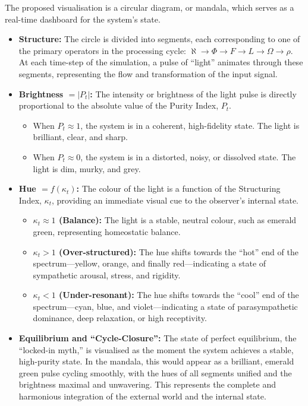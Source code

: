 \documentclass{article}
\begin{document}
The proposed visualisation is a circular diagram, or mandala, which serves as a real-time dashboard for the system's state.

\begin{itemize}
    \item \textbf{Structure:} The circle is divided into segments, each corresponding to one of the primary operators in the processing cycle: $\aleph \rightarrow \Phi \rightarrow F \rightarrow L \rightarrow \Omega \rightarrow \rho$. At each time-step of the simulation, a pulse of ``light'' animates through these segments, representing the flow and transformation of the input signal.
    \item \textbf{Brightness $= |P_t|$:} The intensity or brightness of the light pulse is directly proportional to the absolute value of the Purity Index, $P_t$.
    \begin{itemize}
        \item When $P_t \approx 1$, the system is in a coherent, high-fidelity state. The light is brilliant, clear, and sharp.
        \item When $P_t \approx 0$, the system is in a distorted, noisy, or dissolved state. The light is dim, murky, and grey.
    \end{itemize}
    \item \textbf{Hue $= f(\kappa_t)$:} The colour of the light is a function of the Structuring Index, $\kappa_t$, providing an immediate visual cue to the observer's internal state.
    \begin{itemize}
        \item \textbf{$\kappa_t \approx 1$ (Balance):} The light is a stable, neutral colour, such as emerald green, representing homeostatic balance.
        \item \textbf{$\kappa_t > 1$ (Over-structured):} The hue shifts towards the ``hot'' end of the spectrum---yellow, orange, and finally red---indicating a state of sympathetic arousal, stress, and rigidity.
        \item \textbf{$\kappa_t < 1$ (Under-resonant):} The hue shifts towards the ``cool'' end of the spectrum---cyan, blue, and violet---indicating a state of parasympathetic dominance, deep relaxation, or high receptivity.
    \end{itemize}
    \item \textbf{Equilibrium and ``Cycle-Closure'':} The state of perfect equilibrium, the ``locked-in myth,'' is visualised as the moment the system achieves a stable, high-purity state. In the mandala, this would appear as a brilliant, emerald green pulse cycling smoothly, with the hues of all segments unified and the brightness maximal and unwavering. This represents the complete and harmonious integration of the external world and the internal state.
\end{itemize}
\end{document}
